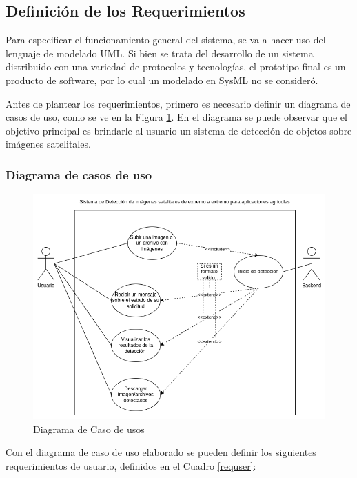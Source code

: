 \newpage
\subsection{Definición de los Requerimientos}

Para especificar el funcionamiento general del sistema, se va a hacer uso del lenguaje de modelado UML. Si bien se trata del desarrollo de un sistema distribuido con una variedad de protocolos y tecnologías, el prototipo final es un producto de software, por lo cual un modelado en SysML \cite{sysml} no se consideró.

Antes de plantear los requerimientos, primero es necesario definir un diagrama de casos de uso, como se ve en la Figura \ref{fig:diagrama-casos-de-uso}. En el diagrama se puede observar que el objetivo principal es brindarle al usuario un sistema de detección de objetos sobre imágenes satelitales.


\subsubsection {Diagrama de casos de uso}

\begin{figure}[h!]
    \centering
    \includegraphics[width=1\textwidth]{img/Diagrama de Casos de usos.drawio (1).png}
    \caption{Diagrama de Caso de usos}
    \label{fig:diagrama-casos-de-uso}
\end{figure}

Con el diagrama de caso de uso elaborado se pueden definir los siguientes requerimientos de usuario, definidos en el Cuadro \ref{requser}:

